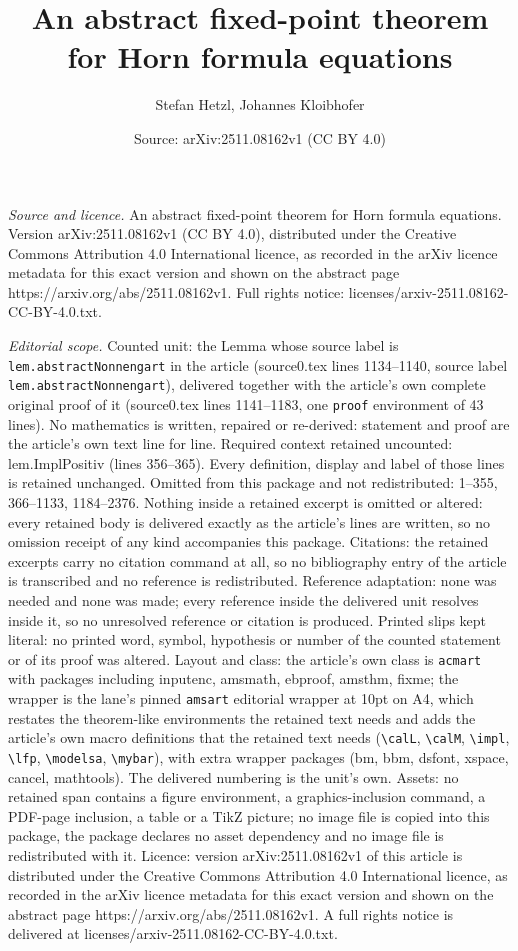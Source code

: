 \documentclass[10pt,a4paper]{amsart}
\title[An abstract fixed-point theorem for Horn formula equations]{An abstract fixed-point theorem for Horn formula equations}
\author{Stefan Hetzl, Johannes Kloibhofer}
\date{Source: arXiv:2511.08162v1 (CC BY 4.0)}
\begin{document}
\maketitle

\noindent\emph{Source and licence.} An abstract fixed-point theorem for Horn formula equations. Version arXiv:2511.08162v1 (CC BY 4.0), distributed under the Creative Commons Attribution 4.0 International licence, as recorded in the arXiv licence metadata for this exact version and shown on the abstract page https://arxiv.org/abs/2511.08162v1. Full rights notice: licenses/arxiv-2511.08162-CC-BY-4.0.txt.\par\smallskip

\noindent\textit{Editorial scope.} Counted unit: the Lemma whose source label is \texttt{lem.abstractNonnengart} in the article (source0.tex lines 1134--1140, source label \texttt{lem.abstractNonnengart}), delivered together with the article's own complete original proof of it (source0.tex lines 1141--1183, one \texttt{proof} environment of 43 lines). No mathematics is written, repaired or re-derived: statement and proof are the article's own text line for line. Required context retained uncounted: lem.ImplPositiv (lines 356--365). Every definition, display and label of those lines is retained unchanged. Omitted from this package and not redistributed: 1--355, 366--1133, 1184--2376. Nothing inside a retained excerpt is omitted or altered: every retained body is delivered exactly as the article's lines are written, so no omission receipt of any kind accompanies this package. Citations: the retained excerpts carry no citation command at all, so no bibliography entry of the article is transcribed and no reference is redistributed. Reference adaptation: none was needed and none was made; every reference inside the delivered unit resolves inside it, so no unresolved reference or citation is produced. Printed slips kept literal: no printed word, symbol, hypothesis or number of the counted statement or of its proof was altered. Layout and class: the article's own class is \texttt{acmart} with packages including inputenc, amsmath, ebproof, amsthm, fixme; the wrapper is the lane's pinned \texttt{amsart} editorial wrapper at 10pt on A4, which restates the theorem-like environments the retained text needs and adds the article's own macro definitions that the retained text needs (\texttt{\textbackslash calL}, \texttt{\textbackslash calM}, \texttt{\textbackslash impl}, \texttt{\textbackslash lfp}, \texttt{\textbackslash modelsa}, \texttt{\textbackslash mybar}), with extra wrapper packages (bm, bbm, dsfont, xspace, cancel, mathtools). The delivered numbering is the unit's own. Assets: no retained span contains a figure environment, a graphics-inclusion command, a PDF-page inclusion, a table or a TikZ picture; no image file is copied into this package, the package declares no asset dependency and no image file is redistributed with it. Licence: version arXiv:2511.08162v1 of this article is distributed under the Creative Commons Attribution 4.0 International licence, as recorded in the arXiv licence metadata for this exact version and shown on the abstract page https://arxiv.org/abs/2511.08162v1. A full rights notice is delivered at licenses/arxiv-2511.08162-CC-BY-4.0.txt. 
\end{document}
